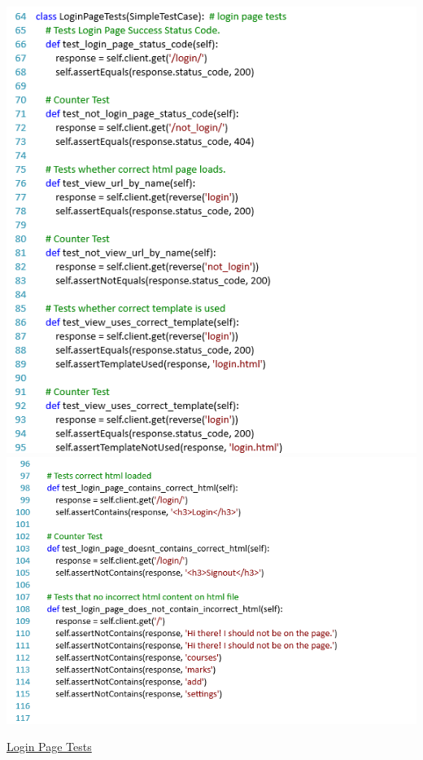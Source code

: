 \documentclass[10pt]{article}
\begin{document}
\begin{center}
\includegraphics[width=.9\textwidth]{page_test1.png}
\includegraphics[width=.9\textwidth]{page_test2.png}
\end{center}
\caption{\underline{Login Page Tests}}
\end{document}
